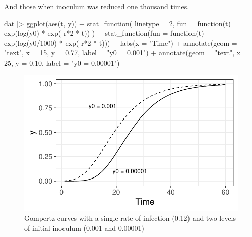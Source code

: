 \documentclass[
  letterpaper,
  DIV=11,
  numbers=noendperiod]{scrreprt}
\newenvironment{Shaded}{\begin{snugshade}}{\end{snugshade}}
\newcommand{\AttributeTok}[1]{\textcolor[rgb]{0.40,0.45,0.13}{#1}}
\newcommand{\ControlFlowTok}[1]{\textcolor[rgb]{0.00,0.23,0.31}{#1}}
\newcommand{\DecValTok}[1]{\textcolor[rgb]{0.68,0.00,0.00}{#1}}
\newcommand{\FloatTok}[1]{\textcolor[rgb]{0.68,0.00,0.00}{#1}}
\newcommand{\FunctionTok}[1]{\textcolor[rgb]{0.28,0.35,0.67}{#1}}
\newcommand{\NormalTok}[1]{\textcolor[rgb]{0.00,0.23,0.31}{#1}}
\newcommand{\SpecialCharTok}[1]{\textcolor[rgb]{0.37,0.37,0.37}{#1}}
\newcommand{\StringTok}[1]{\textcolor[rgb]{0.13,0.47,0.30}{#1}}
\begin{document}
And those when inoculum was reduced one thousand times.

\begin{Shaded}
\begin{Highlighting}[]
\NormalTok{dat }\SpecialCharTok{|\textgreater{}}
  \FunctionTok{ggplot}\NormalTok{(}\FunctionTok{aes}\NormalTok{(t, y)) }\SpecialCharTok{+}
  \FunctionTok{stat\_function}\NormalTok{(}
    \AttributeTok{linetype =} \DecValTok{2}\NormalTok{,}
    \AttributeTok{fun =} \ControlFlowTok{function}\NormalTok{(t) }\FunctionTok{exp}\NormalTok{(}\FunctionTok{log}\NormalTok{(y0) }\SpecialCharTok{*} \FunctionTok{exp}\NormalTok{(}\SpecialCharTok{{-}}\NormalTok{r}\SpecialCharTok{*}\DecValTok{2} \SpecialCharTok{*}\NormalTok{ t))}
\NormalTok{  ) }\SpecialCharTok{+}
  \FunctionTok{stat\_function}\NormalTok{(}\AttributeTok{fun =} \ControlFlowTok{function}\NormalTok{(t) }\FunctionTok{exp}\NormalTok{(}\FunctionTok{log}\NormalTok{(y0}\SpecialCharTok{/}\DecValTok{1000}\NormalTok{) }\SpecialCharTok{*} \FunctionTok{exp}\NormalTok{(}\SpecialCharTok{{-}}\NormalTok{r}\SpecialCharTok{*}\DecValTok{2} \SpecialCharTok{*}\NormalTok{ t))) }\SpecialCharTok{+}
  \FunctionTok{labs}\NormalTok{(}\AttributeTok{x =} \StringTok{"Time"}\NormalTok{) }\SpecialCharTok{+}
  \FunctionTok{annotate}\NormalTok{(}\AttributeTok{geom =} \StringTok{"text"}\NormalTok{, }\AttributeTok{x =} \DecValTok{15}\NormalTok{, }\AttributeTok{y =} \FloatTok{0.77}\NormalTok{, }\AttributeTok{label =} \StringTok{"y0 = 0.001"}\NormalTok{) }\SpecialCharTok{+}
  \FunctionTok{annotate}\NormalTok{(}\AttributeTok{geom =} \StringTok{"text"}\NormalTok{, }\AttributeTok{x =} \DecValTok{25}\NormalTok{, }\AttributeTok{y =} \FloatTok{0.10}\NormalTok{, }\AttributeTok{label =} \StringTok{"y0 = 0.00001"}\NormalTok{)}
\end{Highlighting}
\end{Shaded}

\begin{figure}[H]

{\centering \includegraphics{temporal-models_files/figure-pdf/fig-gomp2-1.pdf}

}

\caption{\label{fig-gomp2}Gompertz curves with a single rate of
infection (0.12) and two levels of initial inoculum (0.001 and 0.00001)}

\end{figure}
\end{document}
